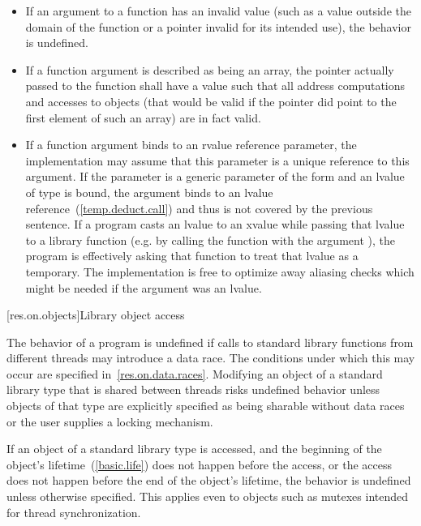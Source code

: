 \begin{itemize}
\item
If an argument to a function has an invalid value (such
%
as a value outside the domain of the function or a pointer invalid for its
intended use), the behavior is undefined.
%

\item
If a function argument is described as being an array,
%
the pointer actually passed to the function shall have a value such that all
address computations and accesses to objects (that would be valid if the
pointer did point to the first element of such an array) are in fact valid.

\item
If a function argument binds to an rvalue reference parameter, the implementation may
assume that this parameter is a unique reference to this argument.
\enternote
If the parameter is a generic parameter of the form  and an lvalue of type
 is bound, the argument binds to an lvalue reference~(\ref{temp.deduct.call})
and thus is not covered by the previous sentence. \exitnote \enternote If a program casts
an lvalue to an xvalue while passing that lvalue to a library function (e.g. by calling the function
with the argument ), the program
is effectively asking that function to treat that lvalue as a temporary. The implementation
is free to optimize away aliasing checks which might be needed if the argument was
an lvalue. \exitnote
\end{itemize}

[res.on.objects]{Library object access}

\pnum
The behavior of a program is undefined if calls to standard library functions from different
threads may introduce a data race. The conditions under which this may occur are specified
in~\ref{res.on.data.races}. \enternote Modifying an object of a standard library type that is
shared between threads risks undefined behavior unless objects of that type are explicitly
specified as being sharable without data races or the user supplies a locking mechanism. \exitnote

\pnum
If an object of a standard library type is accessed, and
the beginning of the object's lifetime~(\ref{basic.life})
does not happen before the access, or
the access does not happen before the end of the object's lifetime,
the behavior is undefined unless otherwise specified.
\enternote
This applies even to objects such as mutexes intended for thread synchronization.
\exitnote

